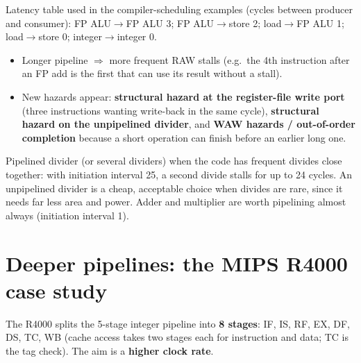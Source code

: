 Latency table used in the compiler-scheduling examples (cycles between producer and consumer): FP ALU$\rightarrow$FP ALU 3; FP ALU$\rightarrow$store 2; load$\rightarrow$FP ALU 1; load$\rightarrow$store 0; integer$\rightarrow$integer 0.

\begin{itemize}
\item Longer pipeline $\Rightarrow$ more frequent RAW stalls (e.g.\ the 4th instruction after an FP add is the first that can use its result without a stall).
\item New hazards appear: \textbf{structural hazard at the register-file write port} (three instructions wanting write-back in the same cycle), \textbf{structural hazard on the unpipelined divider}, and \textbf{WAW hazards / out-of-order completion} because a short operation can finish before an earlier long one.
\end{itemize}

\begin{pick}
Pipelined divider (or several dividers) when the code has frequent divides close together: with initiation interval 25, a second divide stalls for up to 24 cycles. An unpipelined divider is a cheap, acceptable choice when divides are rare, since it needs far less area and power. Adder and multiplier are worth pipelining almost always (initiation interval 1).
\end{pick}

\section{Deeper pipelines: the MIPS R4000 case study}
The R4000 splits the 5-stage integer pipeline into \textbf{8 stages}: IF, IS, RF, EX, DF, DS, TC, WB (cache access takes two stages each for instruction and data; TC is the tag check). The aim is a \textbf{higher clock rate}.

